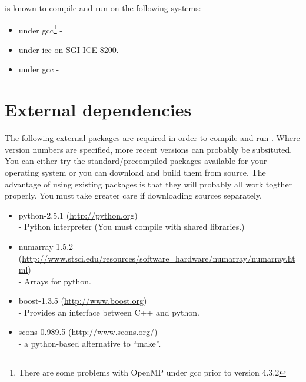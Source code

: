 
%
%
%



\esfinley is known to compile and run on the following systems:
\begin{itemize}
 \item \linux under gcc\footnote{There are some problems with OpenMP under gcc prior to version 4.3.2} - 
\item \linux under icc on SGI ICE 8200.
\item \macosx under gcc - 
\end{itemize}

\section{External dependencies}
The following external packages are required in order to compile and run \esfinley.
Where version numbers are specified, more recent versions can probably be subsituted.
You can either try the standard/precompiled packages available for your operating system or you can download and build them from source.
The advantage of using existing packages is that they will probably all work togther properly.
You must take greater care if downloading sources separately.

\begin{itemize}
 \item python-2.5.1 (\url{http://python.org}) \\
- Python  interpreter (You must compile with shared libraries.)
\item numarray 1.5.2 (\url{http://www.stsci.edu/resources/software_hardware/numarray/numarray.html}) \\
- Arrays for python.
\item boost-1.3.5 (\url{http://www.boost.org}) \\
- Provides an interface between C++ and python.
\item scons-0.989.5 (\url{http://www.scons.org/}) \\
- a python-based alternative to ``make''.
\end{itemize}

